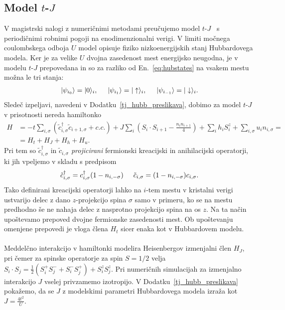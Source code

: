 \subsection{Model $t$-$J$}
V magistrski nalogi z numeričnimi metodami preučujemo model $t$-$J$~\cite{spalek2007tj} s periodičnimi robnimi pogoji na enodimenzionalni verigi. V limiti močnega coulombskega odboja $U$ model opisuje fiziko nizkoenergijskih stanj Hubbardovega modela. Ker je za velike $U$ dvojna zasedenost mest energijsko neugodna, je v modelu $t$-$J$ prepovedana in so za razliko od En.~\eqref{eq:hubstates} na vsakem mestu možna le tri stanja: 
\begin{equation}\label{eq:tjstates}
\vert\psi_{i_0}\rangle=\vert0\rangle_i, \hspace{5mm} \vert\psi_{i_1}\rangle=\vert\uparrow\rangle_i,\hspace{5mm} \vert\psi_{i_{-1}}\rangle=\vert\downarrow\rangle_i.
\end{equation}
Sledeč izpeljavi, navedeni v Dodatku~\ref{tj_hubb_preslikava}, dobimo za model $t$-$J$ v prisotnosti nereda hamiltonko
\begin{equation}\label{eq:tJ_ham}
\begin{split}
H&=-t\sum\limits_{i, \sigma} \left(\tilde{c}_{i,\sigma}^\dagger\tilde{c}_{i+1,\sigma} + c.c. \right) + J\sum\limits_i \left(S_i\cdot S_{i+1} - \frac{n_i n_{i+1}}{4}\right) + \sum\limits_i h_iS_i^z + \sum\limits_{i,\sigma} u_i n_{i,\sigma}=  \\
&=
H_t + H_J + H_h + H_u.
\end{split}
\end{equation}
Pri tem so $\tilde{c}_{i,\sigma}^\dagger$ in  $\tilde{c}_{i,\sigma}$ \emph{projicirani} fermionski kreacijski in anihilacijski operatorji, ki jih vpeljemo v skladu s predpisom 
\begin{equation}
\tilde{c}_{i,\sigma}^\dagger=c_{i,\sigma}^\dagger(1-n_{i,-\sigma}) \hspace{5mm}\tilde{c}_{i,\sigma}=(1-n_{i,-\sigma})c_{i,\sigma}.
\end{equation}
Tako definirani kreacijski operatorji lahko na $i$-tem mestu v kristalni verigi ustvarijo delec z dano $z$-projekcijo spina $\sigma$ samo v primeru, ko se na mestu predhodno še ne nahaja delec z nasprotno projekcijo spina na os $z$. Na ta način upoštevamo prepoved dvojne fermionske zasedenosti mest. Ob upoštevanju omenjene prepovedi je vloga člena $H_t$ sicer enaka kot v Hubbardovem modelu. \\\\ 
Meddelčno interakcijo v hamiltonki modelira Heisenbergov izmenjalni člen $H_J$, pri čemer za spinske operatorje za spin $S=1/2$ velja $S_i\cdot S_{j}=\frac{1}{2}\left(S_i^+S_j^- + S_i^-S_j^+\right) + S_i^zS_j^z$. Pri numeričnih simulacijah za izmenjalno interakcijo $J$ vselej privzamemo izotropijo. V Dodatku~\ref{tj_hubb_preslikava} pokažemo, da se $J$ z modelskimi parametri Hubbardovega modela izraža kot $J=\frac{4t^2}{U}.$ 
